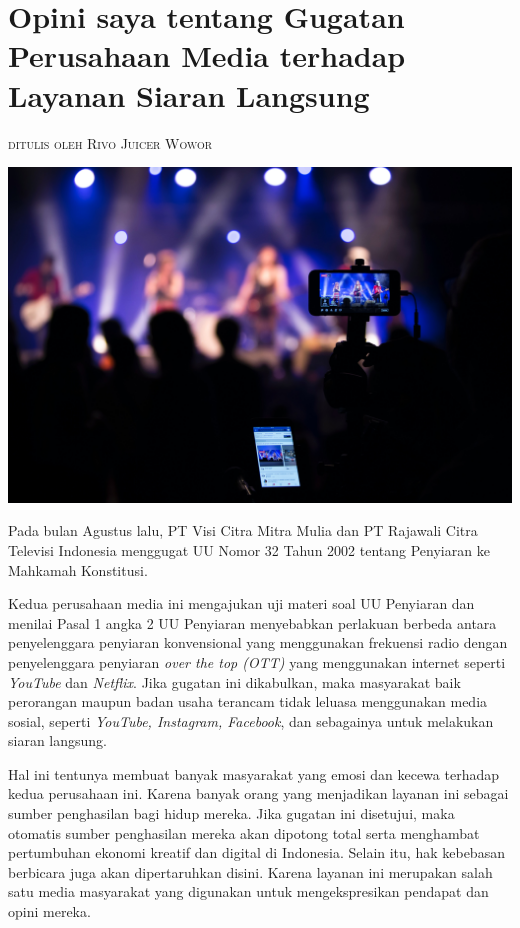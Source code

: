 \documentclass[12pt]{article}
\makeatletter
\newcommand{\chapterauthor}[1]{%
  {\parindent0pt\vspace*{-10pt}%
  \linespread{1.1}\small\scshape#1%
  \par\nobreak\vspace*{10pt}}
  \@afterheading%
}
\makeatother
\begin{document}
    \section*{Opini saya tentang Gugatan Perusahaan Media terhadap Layanan Siaran Langsung}
    \chapterauthor{ditulis oleh Rivo Juicer Wowor}

    \includegraphics[width=1.0\textwidth,trim={0 17cm 0 0},clip]{images/livestream.jpg}
    \vspace{1pt}

    Pada bulan Agustus lalu, PT Visi Citra Mitra Mulia dan PT Rajawali Citra
    Televisi Indonesia menggugat UU Nomor 32 Tahun 2002 tentang Penyiaran ke
    Mahkamah Konstitusi.
    
    Kedua perusahaan media ini mengajukan uji materi
    soal UU Penyiaran dan menilai Pasal 1 angka 2 UU Penyiaran menyebabkan
    perlakuan berbeda antara penyelenggara penyiaran konvensional yang
    menggunakan frekuensi radio dengan penyelenggara penyiaran \emph{over
    the top (OTT)} yang menggunakan internet seperti \emph{YouTube} dan
    \emph{Netflix}. Jika gugatan ini dikabulkan, maka masyarakat baik
    perorangan maupun badan usaha terancam tidak leluasa menggunakan media
    sosial, seperti \emph{YouTube, Instagram, Facebook}, dan sebagainya
    untuk melakukan siaran langsung.
    
    Hal ini tentunya membuat banyak masyarakat yang emosi dan kecewa
    terhadap kedua perusahaan ini. Karena banyak orang yang menjadikan
    layanan ini sebagai sumber penghasilan bagi hidup mereka. Jika gugatan
    ini disetujui, maka otomatis sumber penghasilan mereka akan dipotong
    total serta menghambat pertumbuhan ekonomi kreatif dan digital di
    Indonesia. Selain itu, hak kebebasan berbicara juga akan dipertaruhkan
    disini. Karena layanan ini merupakan salah satu media masyarakat yang
    digunakan untuk mengekspresikan pendapat dan opini mereka.
\end{document}
